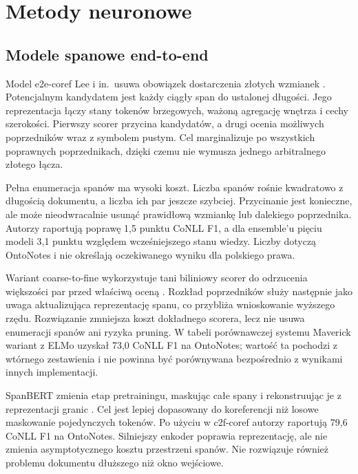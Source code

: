 \section{Metody neuronowe}
\label{sec:metody-neuronowe}

\subsection{Modele spanowe end-to-end}

Model e2e-coref Lee i in.\ usuwa obowiązek dostarczenia złotych wzmianek \cite{lee_2017_e2e}. Potencjalnym kandydatem jest każdy ciągły span do ustalonej długości. Jego reprezentacja łączy stany tokenów brzegowych, ważoną agregację wnętrza i cechy szerokości. Pierwszy scorer przycina kandydatów, a drugi ocenia możliwych poprzedników wraz z symbolem pustym. Cel marginalizuje po wszystkich poprawnych poprzednikach, dzięki czemu nie wymusza jednego arbitralnego złotego łącza.

Pełna enumeracja spanów ma wysoki koszt. Liczba spanów rośnie kwadratowo z długością dokumentu, a liczba ich par jeszcze szybciej. Przycinanie jest konieczne, ale może nieodwracalnie usunąć prawidłową wzmiankę lub dalekiego poprzednika. Autorzy raportują poprawę 1,5 punktu CoNLL F1, a dla ensemble'u pięciu modeli 3,1 punktu względem wcześniejszego stanu wiedzy. Liczby dotyczą OntoNotes i nie określają oczekiwanego wyniku dla polskiego prawa.

Wariant coarse-to-fine wykorzystuje tani biliniowy scorer do odrzucenia większości par przed właściwą oceną \cite{lee_2018_higher}. Rozkład poprzedników służy następnie jako uwaga aktualizująca reprezentację spanu, co przybliża wnioskowanie wyższego rzędu. Rozwiązanie zmniejsza koszt dokładnego scorera, lecz nie usuwa enumeracji spanów ani ryzyka pruning. W tabeli porównawczej systemu Maverick wariant z ELMo uzyskał 73,0 CoNLL F1 na OntoNotes; wartość ta pochodzi z wtórnego zestawienia i nie powinna być porównywana bezpośrednio z wynikami innych implementacji.

SpanBERT zmienia etap pretrainingu, maskując całe spany i rekonstruując je z reprezentacji granic \cite{joshi_2020_spanbert}. Cel jest lepiej dopasowany do koreferencji niż losowe maskowanie pojedynczych tokenów. Po użyciu w c2f-coref autorzy raportują 79,6 CoNLL F1 na OntoNotes. Silniejszy enkoder poprawia reprezentację, ale nie zmienia asymptotycznego kosztu przestrzeni spanów. Nie rozwiązuje również problemu dokumentu dłuższego niż okno wejściowe.

